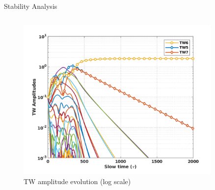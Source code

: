 \documentclass[dvipsnames, aspectratio = 169]{beamer}
\begin{document}
\begin{frame}{Stability Analysis}
\begin{columns}
\begin{column}{0.5\textwidth}
\begin{figure}[h]
				\includegraphics[width = 0.9\textwidth]{log_TW_amplitude.png}
				\caption{TW amplitude evolution (log scale)}
				\label{fig:log_TW_amp_base2}
			\end{figure}
		\end{column}
	\end{columns}
\end{frame}
\end{document}
